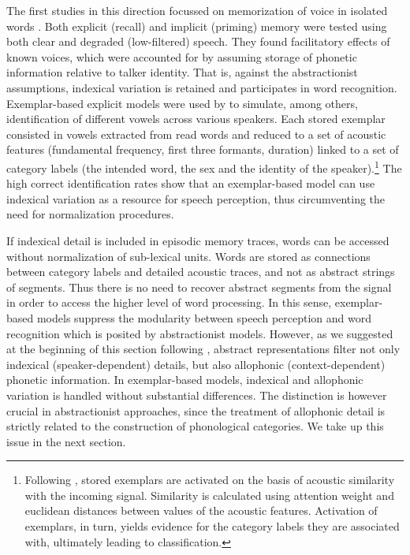 The first studies in this direction focussed on memorization of voice in isolated words \citep{goldinger1991nature,schacter1992auditory,palmeri1993episodic,church1994perceptual,goldinger1996words}. Both explicit (recall) and implicit (priming) memory were tested using both clear and degraded (low-filtered) speech. They found facilitatory effects of known voices, which were accounted for by assuming storage of phonetic information relative to talker identity. That is, against the abstractionist assumptions, indexical variation is retained and participates in word recognition. Exemplar-based explicit models were used by \citet{johnson1997speech} to simulate, among others, identification of different vowels across various speakers. Each stored exemplar consisted in vowels extracted from read words and reduced to a set of acoustic features (fundamental frequency, first three formants, duration) linked to a set of category labels (the intended word, the sex and the identity of the speaker).\footnote{Following \citet{nosofsky1988exemplar}, stored exemplars are activated on the basis of acoustic similarity with the incoming signal. Similarity is calculated using attention weight and euclidean distances between values of the acoustic features. Activation of exemplars, in turn, yields evidence for the category labels they are associated with, ultimately leading to classification.} The high correct identification rates show that an exemplar-based model can use indexical variation as a resource for speech perception, thus circumventing the need for normalization procedures.

If indexical detail is included in episodic memory traces, words can be accessed without normalization of sub-lexical units. Words are stored as connections between category labels and detailed acoustic traces, and not as abstract strings of segments. Thus there is no need to recover abstract segments from the signal in order to access the higher level of word processing. In this sense, exemplar-based models suppress the modularity between speech perception and word recognition which is posited by abstractionist models. However, as we suggested at the beginning of this section following \citet{luce2003abstractness}, abstract representations filter not only indexical (speaker-dependent) details, but also allophonic (context-dependent) phonetic information. In exemplar-based models, indexical and allophonic variation is handled without substantial differences. The distinction is however crucial in abstractionist approaches, since the treatment of allophonic detail is strictly related to the construction of phonological categories. We take up this issue in the next section.

